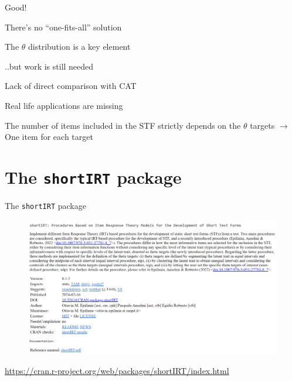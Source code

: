 \documentclass[aspectratio=149, compress]{beamer}
\begin{document}
\begin{frame}


\begin{exampleblock}{Good!}
	
	There's no ``one-fits-all'' solution
	
	\vspace{2mm}
	
	The $\theta$ distribution is a key element
\end{exampleblock}

\pause
\begin{alertblock}{..but work is still needed}
	
	Lack of direct comparison with CAT
	
	Real life applications are missing
	
	The number of items included in the STF strictly depends on the $\theta$ targets $\rightarrow$ One item for each target
	
\end{alertblock}

\end{frame}

\section[\texttt{shortIRT}]{The \texttt{shortIRT} package}

\begin{frame}[plain]{The \texttt{shortIRT} package}
\begin{figure}
	\centering
	\includegraphics[width=\linewidth]{img/shortIRT}
\end{figure}

\href{https://cran.r-project.org/web/packages/shortIRT/index.html}{https://cran.r-project.org/web/packages/shortIRT/index.html}

\end{frame}
\end{document}
